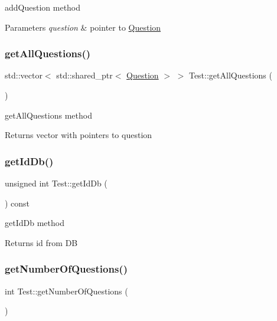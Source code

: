 add\+Question method 


\begin{DoxyParams}{Parameters}
{\em question} & pointer to \hyperlink{class_question}{Question} \\
\hline
\end{DoxyParams}
\mbox{\label{class_test_a0e0a0ce90b46ea89e11200d242987e33}} 
\subsubsection{\texorpdfstring{get\+All\+Questions()}{getAllQuestions()}}
{\footnotesize\ttfamily std\+::vector$<$ std\+::shared\+\_\+ptr$<$ \hyperlink{class_question}{Question} $>$ $>$ Test\+::get\+All\+Questions (\begin{DoxyParamCaption}{ }\end{DoxyParamCaption})}



get\+All\+Questions method 

\begin{DoxyReturn}{Returns}
vector with pointers to question 
\end{DoxyReturn}
\mbox{\label{class_test_a00aae8f1d964e34600ca99354e0aff66}} 
\subsubsection{\texorpdfstring{get\+Id\+Db()}{getIdDb()}}
{\footnotesize\ttfamily unsigned int Test\+::get\+Id\+Db (\begin{DoxyParamCaption}{ }\end{DoxyParamCaption}) const}



get\+Id\+Db method 

\begin{DoxyReturn}{Returns}
id from DB 
\end{DoxyReturn}
\mbox{\label{class_test_a9dea10c897bfbd2a7fa669c1b49a4b80}} 
\subsubsection{\texorpdfstring{get\+Number\+Of\+Questions()}{getNumberOfQuestions()}}
{\footnotesize\ttfamily int Test\+::get\+Number\+Of\+Questions (\begin{DoxyParamCaption}{ }\end{DoxyParamCaption})}



